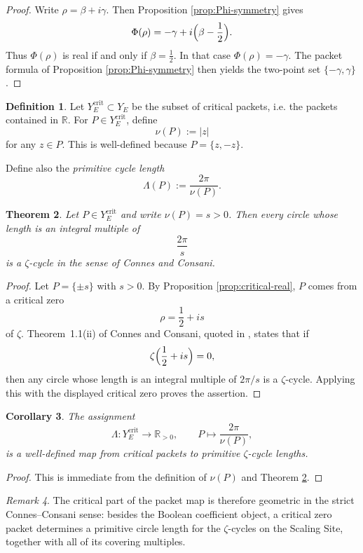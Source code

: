 \documentclass[11pt,a4paper]{article}
\newtheorem{theorem}{Theorem}[section]
\newtheorem{corollary}[theorem]{Corollary}
\theoremstyle{definition}
\newtheorem{definition}[theorem]{Definition}
\theoremstyle{remark}
\newtheorem{remark}[theorem]{Remark}
\newcommand{\RR}{\mathbb R}
\begin{document}
\begin{proof}
Write $\rho=\beta+i\gamma$.  Then Proposition \ref{prop:Phi-symmetry} gives
\[
\Phi(\rho)=-\gamma+i\Bigl(\beta-\frac12\Bigr).
\]
Thus $\Phi(\rho)$ is real if and only if $\beta=\frac12$.  In that case $\Phi(\rho)=-\gamma$.  The packet formula of Proposition \ref{prop:Phi-symmetry} then yields the two-point set $\{-\gamma,\gamma\}$.
\end{proof}

\begin{definition}
Let $Y_E^{\mathrm{crit}}\subset Y_E$ be the subset of critical packets, i.e. the packets contained in $\RR$.  For $P\in Y_E^{\mathrm{crit}}$, define
\[
\nu(P):=|z|
\]
for any $z\in P$.  This is well-defined because $P=\{z,-z\}$.

Define also the \emph{primitive cycle length}
\[
\Lambda(P):=\frac{2\pi}{\nu(P)}.
\]
\end{definition}

\begin{theorem}\label{thm:zeta-cycles}
Let $P\in Y_E^{\mathrm{crit}}$ and write $\nu(P)=s>0$.  Then every circle whose length is an integral multiple of
\[
\frac{2\pi}{s}
\]
is a $\zeta$-cycle in the sense of Connes and Consani.
\end{theorem}

\begin{proof}
Let $P=\{\pm s\}$ with $s>0$.  By Proposition \ref{prop:critical-real}, $P$ comes from a critical zero
\[
\rho=\frac12+is
\]
of $\zeta$.  Theorem~1.1(ii) of Connes and Consani, quoted in \cite{ConnesConsaniCycles}, states that if
\[
\zeta\Bigl(\frac12+is\Bigr)=0,
\]
then any circle whose length is an integral multiple of $2\pi/s$ is a $\zeta$-cycle.  Applying this with the displayed critical zero proves the assertion.
\end{proof}

\begin{corollary}\label{cor:critical-map}
The assignment
\[
\Lambda:Y_E^{\mathrm{crit}}\longrightarrow \RR_{>0},
\qquad
P\longmapsto \frac{2\pi}{\nu(P)},
\]
is a well-defined map from critical packets to primitive $\zeta$-cycle lengths.
\end{corollary}

\begin{proof}
This is immediate from the definition of $\nu(P)$ and Theorem \ref{thm:zeta-cycles}.
\end{proof}

\begin{remark}
The critical part of the packet map is therefore geometric in the strict Connes--Consani sense: besides the Boolean coefficient object, a critical zero packet determines a primitive circle length for the $\zeta$-cycles on the Scaling Site, together with all of its covering multiples.
\end{remark}
\end{document}
